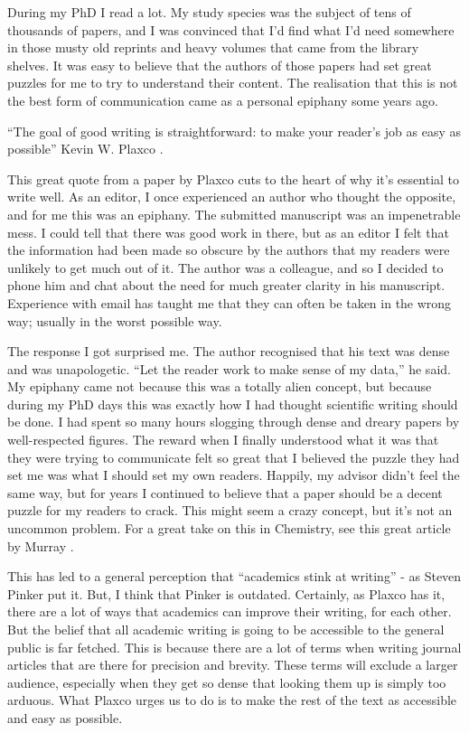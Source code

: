 \documentclass[
]{krantz}
\renewenvironment{quote}{\begin{VF}}{\end{VF}}
\begin{document}
During my PhD I read a lot. My study species was the subject of tens of thousands of papers, and I was convinced that I'd find what I'd need somewhere in those musty old reprints and heavy volumes that came from the library shelves. It was easy to believe that the authors of those papers had set great puzzles for me to try to understand their content. The realisation that this is not the best form of communication came as a personal epiphany some years ago.

\begin{quote}
``The goal of good writing is straightforward: to make your reader's job as easy as possible''
Kevin W. Plaxco \citeyearpar{plaxco2010art}.
\end{quote}

This great quote from a paper by Plaxco \citeyearpar{plaxco2010art} cuts to the heart of why it's essential to write well. As an editor, I once experienced an author who thought the opposite, and for me this was an epiphany. The submitted manuscript was an impenetrable mess. I could tell that there was good work in there, but as an editor I felt that the information had been made so obscure by the authors that my readers were unlikely to get much out of it. The author was a colleague, and so I decided to phone him and chat about the need for much greater clarity in his manuscript. Experience with email has taught me that they can often be taken in the wrong way; usually in the worst possible way.

The response I got surprised me. The author recognised that his text was dense and was unapologetic. ``Let the reader work to make sense of my data,'' he said. My epiphany came not because this was a totally alien concept, but because during my PhD days this was exactly how I had thought scientific writing should be done. I had spent so many hours slogging through dense and dreary papers by well-respected figures. The reward when I finally understood what it was that they were trying to communicate felt so great that I believed the puzzle they had set me was what I should set my own readers. Happily, my advisor didn't feel the same way, but for years I continued to believe that a paper should be a decent puzzle for my readers to crack. This might seem a crazy concept, but it's not an uncommon problem. For a great take on this in Chemistry, see this great article by Murray \citeyearpar{murray2011skillful}.

This has led to a general perception that ``academics stink at writing'' - as Steven Pinker put it. But, I think that Pinker is outdated. Certainly, as Plaxco \citeyearpar{plaxco2010art} has it, there are a lot of ways that academics can improve their writing, for each other. But the belief that all academic writing is going to be accessible to the general public is far fetched. This is because there are a lot of terms when writing journal articles that are there for precision and brevity. These terms will exclude a larger audience, especially when they get so dense that looking them up is simply too arduous. What Plaxco \citeyearpar{plaxco2010art} urges us to do is to make the rest of the text as accessible and easy as possible.
\end{document}
